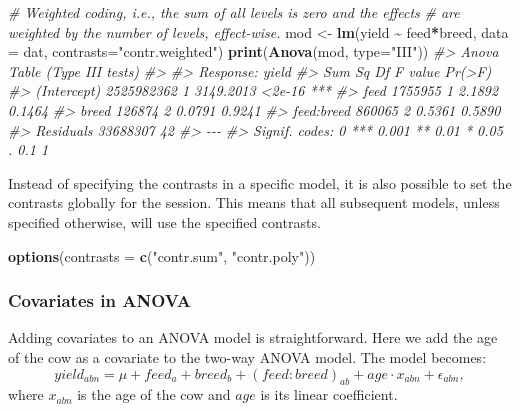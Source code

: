 \documentclass[
]{article}
\newenvironment{Shaded}{\begin{snugshade}}{\end{snugshade}}
\newcommand{\AttributeTok}[1]{\textcolor[rgb]{0.13,0.29,0.53}{#1}}
\newcommand{\CommentTok}[1]{\textcolor[rgb]{0.56,0.35,0.01}{\textit{#1}}}
\newcommand{\FunctionTok}[1]{\textcolor[rgb]{0.13,0.29,0.53}{\textbf{#1}}}
\newcommand{\NormalTok}[1]{#1}
\newcommand{\OtherTok}[1]{\textcolor[rgb]{0.56,0.35,0.01}{#1}}
\newcommand{\SpecialCharTok}[1]{\textcolor[rgb]{0.81,0.36,0.00}{\textbf{#1}}}
\newcommand{\StringTok}[1]{\textcolor[rgb]{0.31,0.60,0.02}{#1}}
\begin{document}
\begin{Shaded}
\begin{Highlighting}[]
\CommentTok{\# Weighted coding, i.e., the sum of all levels is zero and the effects}
\CommentTok{\# are weighted by the number of levels, effect{-}wise.}
\NormalTok{mod }\OtherTok{\textless{}{-}} \FunctionTok{lm}\NormalTok{(yield }\SpecialCharTok{\textasciitilde{}}\NormalTok{ feed}\SpecialCharTok{*}\NormalTok{breed, }\AttributeTok{data =}\NormalTok{ dat, }\AttributeTok{contrasts=}\StringTok{"contr.weighted"}\NormalTok{)}
\FunctionTok{print}\NormalTok{(}\FunctionTok{Anova}\NormalTok{(mod, }\AttributeTok{type=}\StringTok{"III"}\NormalTok{))}
\CommentTok{\#\textgreater{} Anova Table (Type III tests)}
\CommentTok{\#\textgreater{} }
\CommentTok{\#\textgreater{} Response: yield}
\CommentTok{\#\textgreater{}                 Sum Sq Df   F value Pr(\textgreater{}F)    }
\CommentTok{\#\textgreater{} (Intercept) 2525982362  1 3149.2013 \textless{}2e{-}16 ***}
\CommentTok{\#\textgreater{} feed           1755955  1    2.1892 0.1464    }
\CommentTok{\#\textgreater{} breed           126874  2    0.0791 0.9241    }
\CommentTok{\#\textgreater{} feed:breed      860065  2    0.5361 0.5890    }
\CommentTok{\#\textgreater{} Residuals     33688307 42                     }
\CommentTok{\#\textgreater{} {-}{-}{-}}
\CommentTok{\#\textgreater{} Signif. codes:  0 \textquotesingle{}***\textquotesingle{} 0.001 \textquotesingle{}**\textquotesingle{} 0.01 \textquotesingle{}*\textquotesingle{} 0.05 \textquotesingle{}.\textquotesingle{} 0.1 \textquotesingle{} \textquotesingle{} 1}
\end{Highlighting}
\end{Shaded}

Instead of specifying the contrasts in a specific model, it is also
possible to set the contrasts globally for the session. This means that
all subsequent models, unless specified otherwise, will use the
specified contrasts.

\begin{Shaded}
\begin{Highlighting}[]
\FunctionTok{options}\NormalTok{(}\AttributeTok{contrasts =} \FunctionTok{c}\NormalTok{(}\StringTok{"contr.sum"}\NormalTok{, }\StringTok{"contr.poly"}\NormalTok{))}
\end{Highlighting}
\end{Shaded}

\subsubsection{Covariates in ANOVA}\label{covariates-in-anova}

Adding covariates to an ANOVA model is straightforward. Here we add the
age of the cow as a covariate to the two-way ANOVA model. The model
becomes:
\[yield_{abn} = \mu + feed_a + breed_b + (feed:breed)_{ab} + age\cdot x_{abn} + \epsilon_{abn},\]
where \(x_{abn}\) is the age of the cow and \(age\) is its linear
coefficient.
\end{document}
